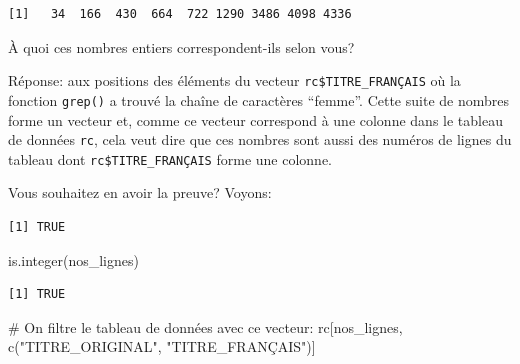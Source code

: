 \documentclass[
  letterpaper,
  DIV=11,
  numbers=noendperiod]{scrartcl}
\newenvironment{Shaded}{\begin{snugshade}}{\end{snugshade}}
\newcommand{\CommentTok}[1]{\textcolor[rgb]{0.37,0.37,0.37}{#1}}
\newcommand{\FunctionTok}[1]{\textcolor[rgb]{0.28,0.35,0.67}{#1}}
\newcommand{\NormalTok}[1]{\textcolor[rgb]{0.00,0.23,0.31}{#1}}
\newcommand{\OtherTok}[1]{\textcolor[rgb]{0.00,0.23,0.31}{#1}}
\newcommand{\SpecialCharTok}[1]{\textcolor[rgb]{0.37,0.37,0.37}{#1}}
\newcommand{\StringTok}[1]{\textcolor[rgb]{0.13,0.47,0.30}{#1}}
\begin{document}
\begin{verbatim}
[1]   34  166  430  664  722 1290 3486 4098 4336
\end{verbatim}

À quoi ces nombres entiers correspondent-ils selon vous?

Réponse: aux positions des éléments du vecteur
\texttt{rc\$TITRE\_FRANÇAIS} où la fonction \texttt{grep()} a trouvé la
chaîne de caractères ``femme''. Cette suite de nombres forme un vecteur
et, comme ce vecteur correspond à une colonne dans le tableau de données
\texttt{rc}, cela veut dire que ces nombres sont aussi des numéros de
lignes du tableau dont \texttt{rc\$TITRE\_FRANÇAIS} forme une colonne.

Vous souhaitez en avoir la preuve? Voyons:

\begin{Shaded}
\end{Shaded}

\begin{verbatim}
[1] TRUE
\end{verbatim}

\begin{Shaded}
\begin{Highlighting}[]
\FunctionTok{is.integer}\NormalTok{(nos\_lignes)}
\end{Highlighting}
\end{Shaded}

\begin{verbatim}
[1] TRUE
\end{verbatim}

\begin{Shaded}
\begin{Highlighting}[]
\CommentTok{\# On filtre le tableau de données avec ce vecteur:}
\NormalTok{rc[nos\_lignes, }\FunctionTok{c}\NormalTok{(}\StringTok{"TITRE\_ORIGINAL"}\NormalTok{, }\StringTok{"TITRE\_FRANÇAIS"}\NormalTok{)]}
\end{Highlighting}
\end{Shaded}
\end{document}
